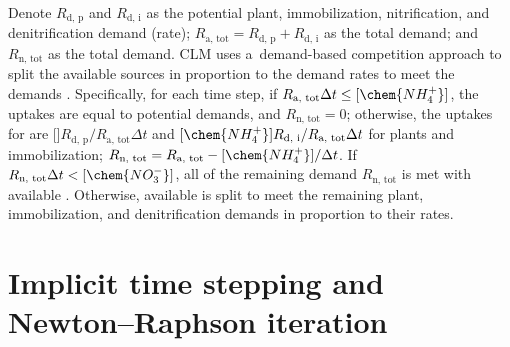 \documentclass[gmdd, online, hvmath]{copernicus}
\begin{document}
      Denote $R_{\text{d, p}}$ and $R_{\text{d, i}}$ as the potential plant,
      immobilization, nitrification, and denitrification demand (rate);
      $R_{\text{a, tot}}=R_{\text{d, p}}+R_{\text{d, i}}$ as the total
       demand; and $R_{\text{n, tot}}$ as the total
       demand. CLM uses a~demand-based competition approach to
      split the available sources in proportion to the demand rates to meet
      the demands \citep{Oleson2013,Thornton2005}. Specifically, for each
      time step, if $R_{\text{a, tot}}\Delta t \leq [\chem{NH_4^+}]$, the
      uptakes are equal to potential demands, and $R_{\text{n, tot}}=0$;
      otherwise, the uptakes for  are
      []$R_{\text{d, p}}/R_{\text{a, tot}}\Delta t$ and
      $[\chem{NH_4^+}] R_{\text{d, i}}/R_{\text{a, tot}}\Delta t$ for plants
      and immobilization; $R_{\text{n, tot}}=R_{\text{a,
      tot}}-[\chem{NH_4^+}]/\Delta t$. If $R_{\text{n, tot}}\Delta t <
      [\chem{NO_3^-}]$, all of the remaining demand $R_{\text{n, tot}}$ is
      met with available . Otherwise, available 
      is split to meet the remaining plant, immobilization, and
      denitrification demands in proportion to their rates.




\section{Implicit time stepping and Newton--Raphson iteration}%
\label{sec:newton}
\end{document}
